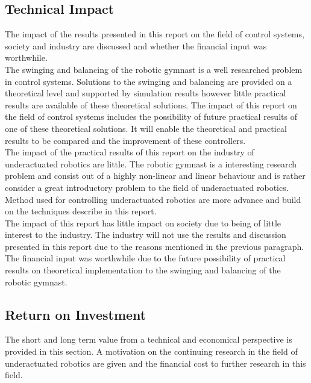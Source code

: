 \subsection{Technical Impact}
The impact of the results presented in this report on the field of control systems, society and industry are discussed and whether the financial input was worthwhile.\\

The swinging and balancing of the robotic gymnast is a well researched problem in control systems. Solutions to the swinging and balancing are provided on a theoretical level and supported by simulation results however little practical results are available of these theoretical solutions. The impact of this report on the field of control systems includes the possibility of future practical results of one of these theoretical solutions. It will enable the theoretical and practical results to be compared and the improvement of these controllers.\\

The impact of the practical results of this report on the industry of underactuated robotics are little. The robotic gymnast is a interesting research problem and consist out of a highly non-linear and linear behaviour and is rather consider a great introductory problem to the field of underactuated robotics. Method used for controlling underactuated robotics are more advance and build on the techniques describe in this report.\\

The impact of this report has little impact on society due to being of little interest to the industry. The industry will not use the results and discussion presented in this report due to the reasons mentioned in the previous paragraph.\\

The financial input was worthwhile due to the future possibility of practical results on theoretical implementation to the swinging and balancing of the robotic gymnast.\\


\subsection{Return on Investment}
The short and long term value from a technical and economical perspective is provided in this section. A motivation on the continuing research in the field of underactuated robotics are given and the financial cost to further research in this field.\\

